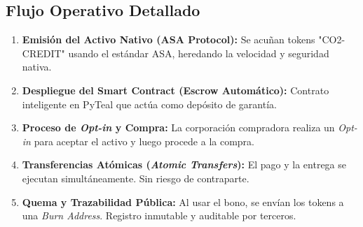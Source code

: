 \documentclass[12pt]{article}
\begin{document}
\subsection{Flujo Operativo Detallado}
\begin{enumerate}
    \item \textbf{Emisión del Activo Nativo (ASA Protocol):} Se acuñan tokens "CO2-CREDIT" usando el estándar ASA, heredando la velocidad y seguridad nativa.
    \item \textbf{Despliegue del Smart Contract (Escrow Automático):} Contrato inteligente en PyTeal que actúa como depósito de garantía.
    \item \textbf{Proceso de \textit{Opt-in} y Compra:} La corporación compradora realiza un \textit{Opt-in} para aceptar el activo y luego procede a la compra.
    \item \textbf{Transferencias Atómicas (\textit{Atomic Transfers}):} El pago y la entrega se ejecutan simultáneamente. Sin riesgo de contraparte.
    \item \textbf{Quema y Trazabilidad Pública:} Al usar el bono, se envían los tokens a una \textit{Burn Address}. Registro inmutable y auditable por terceros.
\end{enumerate}
\end{document}
